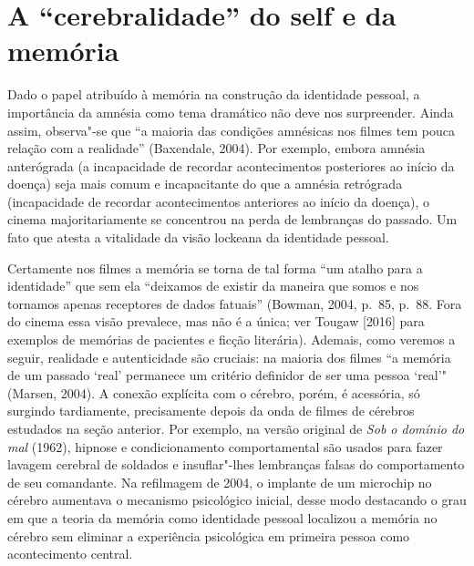 \section{A ``cerebralidade'' do self e da memória}

Dado o papel atribuído à memória na construção da identidade pessoal, a
importância da amnésia como tema dramático não deve nos surpreender.
Ainda assim, observa"-se que ``a maioria das condições amnésicas nos
filmes tem pouca relação com a realidade'' (Baxendale, 2004). Por
exemplo, embora amnésia anterógrada (a incapacidade de recordar
acontecimentos posteriores ao início da doença) seja mais comum e
incapacitante do que a amnésia retrógrada (incapacidade de recordar
acontecimentos anteriores ao início da doença), o cinema
majoritariamente se concentrou na perda de lembranças do passado. Um
fato que atesta a vitalidade da visão lockeana da identidade pessoal.

Certamente nos filmes a memória se torna de tal forma ``um atalho para a
identidade'' que sem ela ``deixamos de existir da maneira que somos e
nos tornamos apenas receptores de dados fatuais'' (Bowman, 2004, p.~85,
p.~88. Fora do cinema essa visão prevalece, mas não é a única; ver Tougaw
{[}2016{]} para exemplos de memórias de pacientes e ficção literária).
Ademais, como veremos a seguir, realidade e autenticidade são cruciais:
na maioria dos filmes ``a memória de um passado `real' permanece um
critério definidor de ser uma pessoa `real'" (Marsen, 2004). A conexão
explícita com o cérebro, porém, é acessória, só surgindo tardiamente,
precisamente depois da onda de filmes de cérebros estudados na seção
anterior. Por exemplo, na versão original de \emph{Sob o domínio do mal}
(1962), hipnose e condicionamento comportamental são usados para fazer
lavagem cerebral de soldados e insuflar"-lhes lembranças falsas do
comportamento de seu comandante. Na refilmagem de 2004, o implante de um
microchip no cérebro aumentava o mecanismo psicológico inicial, desse
modo destacando o grau em que a teoria da memória como identidade
pessoal localizou a memória no cérebro sem eliminar a experiência
psicológica em primeira pessoa como acontecimento central.

